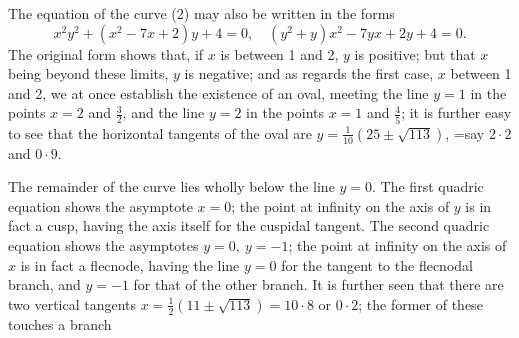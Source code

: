 \documentclass[10pt,twoside]{article}
\begin{document}
The equation of the curve (2) may also be written in the forms
\[
x^2y^2+(x^2-7x+2)y+4=0,\quad
(y^2+y)x^2-7yx+2y+4=0.
\]
The original form shows that, if \(x\) is between 1 and 2, \(y\) is positive; but that \(x\) being beyond these limits, \(y\) is negative; and as regards the first case, \(x\) between 1 and 2, we at once establish the existence of an oval, meeting the line \(y=1\) in the points \(x=2\) and \(\frac32\), and the line \(y=2\) in the points \(x=1\) and \(\frac45\); it is further easy to see that the horizontal tangents of the oval are \(y=\frac{1}{10}(25\pm\sqrt{113})\), =say \(2\cdot2\) and \(0\cdot9\).

The remainder of the curve lies wholly below the line \(y=0\). The first quadric equation shows the asymptote \(x=0\); the point at infinity on the axis of \(y\) is in fact a cusp, having the axis itself for the cuspidal tangent. The second quadric equation shows the asymptotes \(y=0,\ y=-1\); the point at infinity on the axis of \(x\) is in fact a flecnode, having the line \(y=0\) for the tangent to the flecnodal branch, and \(y=-1\) for that of the other branch. It is further seen that there are two vertical tangents \(x=\frac12(11\pm\sqrt{113})=10\cdot8\) or \(0\cdot2\); the former of these touches a branch
\end{document}
